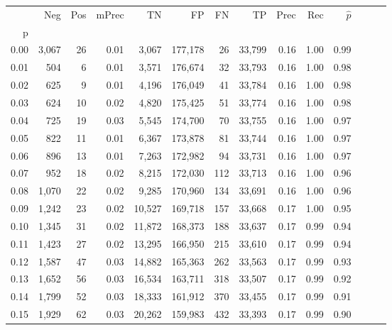 \begin{tabular}{rrrrrrrrrrrrrr}
\toprule
{} &    Neg &  Pos & mPrec &       TN &       FP &      FN &      TP &  Prec &   Rec & $\hat{p}$ \\
p    &        &      &       &          &          &         &         &       &       &           \\
\midrule
0.00 &  3,067 &   26 &  0.01 &    3,067 &  177,178 &      26 &  33,799 &  0.16 &  1.00 &      0.99 \\
0.01 &    504 &    6 &  0.01 &    3,571 &  176,674 &      32 &  33,793 &  0.16 &  1.00 &      0.98 \\
0.02 &    625 &    9 &  0.01 &    4,196 &  176,049 &      41 &  33,784 &  0.16 &  1.00 &      0.98 \\
0.03 &    624 &   10 &  0.02 &    4,820 &  175,425 &      51 &  33,774 &  0.16 &  1.00 &      0.98 \\
0.04 &    725 &   19 &  0.03 &    5,545 &  174,700 &      70 &  33,755 &  0.16 &  1.00 &      0.97 \\
0.05 &    822 &   11 &  0.01 &    6,367 &  173,878 &      81 &  33,744 &  0.16 &  1.00 &      0.97 \\
0.06 &    896 &   13 &  0.01 &    7,263 &  172,982 &      94 &  33,731 &  0.16 &  1.00 &      0.97 \\
0.07 &    952 &   18 &  0.02 &    8,215 &  172,030 &     112 &  33,713 &  0.16 &  1.00 &      0.96 \\
0.08 &  1,070 &   22 &  0.02 &    9,285 &  170,960 &     134 &  33,691 &  0.16 &  1.00 &      0.96 \\
0.09 &  1,242 &   23 &  0.02 &   10,527 &  169,718 &     157 &  33,668 &  0.17 &  1.00 &      0.95 \\
0.10 &  1,345 &   31 &  0.02 &   11,872 &  168,373 &     188 &  33,637 &  0.17 &  0.99 &      0.94 \\
0.11 &  1,423 &   27 &  0.02 &   13,295 &  166,950 &     215 &  33,610 &  0.17 &  0.99 &      0.94 \\
0.12 &  1,587 &   47 &  0.03 &   14,882 &  165,363 &     262 &  33,563 &  0.17 &  0.99 &      0.93 \\
0.13 &  1,652 &   56 &  0.03 &   16,534 &  163,711 &     318 &  33,507 &  0.17 &  0.99 &      0.92 \\
0.14 &  1,799 &   52 &  0.03 &   18,333 &  161,912 &     370 &  33,455 &  0.17 &  0.99 &      0.91 \\
0.15 &  1,929 &   62 &  0.03 &   20,262 &  159,983 &     432 &  33,393 &  0.17 &  0.99 &      0.90 \\

\end{tabular}
